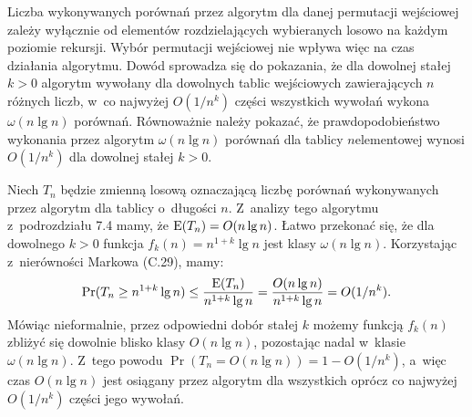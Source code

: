 \exercise %

\noindent Liczba wykonywanych porównań przez algorytm  dla danej permutacji wejściowej zależy wyłącznie od elementów rozdzielających wybieranych losowo na każdym poziomie rekursji.
Wybór permutacji wejściowej nie wpływa więc na czas działania algorytmu.
Dowód sprowadza się do pokazania, że dla dowolnej stałej $k>0$ algorytm  wywołany dla dowolnych tablic wejściowych zawierających $n$ różnych liczb, w~co najwyżej $O(1/n^k)$ części wszystkich wywołań wykona $\omega(n\lg n)$ porównań.
Równoważnie należy pokazać, że prawdopodobieństwo wykonania przez algorytm $\omega(n\lg n)$ porównań dla tablicy $n$\nbhyphen elementowej wynosi $O(1/n^k)$ dla dowolnej stałej $k>0$.

Niech $T_n$ będzie zmienną losową oznaczającą liczbę porównań wykonywanych przez algorytm  dla tablicy o~długości $n$.
Z~analizy tego algorytmu z~podrozdziału 7.4 mamy, że $\operatorname{E}(T_n)=O(n\lg n)$.
Łatwo przekonać się, że dla dowolnego $k>0$ funkcja $f_k(n)=n^{1+k}\lg n$ jest klasy $\omega(n\lg n)$.
Korzystając z~nierówności Markowa (C.29), mamy:
\[
	\Pr(T_n\ge n^{1+k}\lg n) \le \frac{\operatorname{E}(T_n)}{n^{1+k}\lg n} = \frac{O(n\lg n)}{n^{1+k}\lg n} = O(1/n^k).
\]
Mówiąc nieformalnie, przez odpowiedni dobór stałej $k$ możemy funkcją $f_k(n)$ zbliżyć się dowolnie blisko klasy $O(n\lg n)$, pozostając nadal w~klasie $\omega(n\lg n)$.
Z~tego powodu $\Pr(T_n=O(n\lg n))=1-O(1/n^k)$, a~więc czas $O(n\lg n)$ jest osiągany przez algorytm dla wszystkich oprócz co najwyżej $O(1/n^k)$ części jego wywołań.
